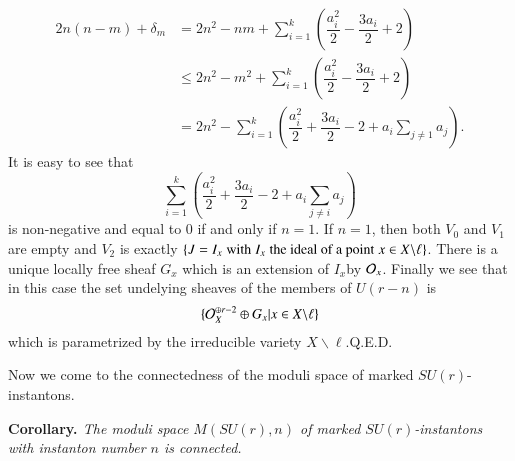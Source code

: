 \begin{itemize}
\begin{equation*}
\begin{split}
2n(n-m)+ \delta_{m} & = 2n^{2}-nm + \sum\limits_{i=1}^{k}\left(\dfrac{a_{i}^{2}}{2}- \dfrac{3a_{i}}{2} + 2\right)\\
& \leq 2n^{2}-m^{2} + \sum\limits_{i=1}^{k}\left(\dfrac{a_{i}^{2}}{2}-\dfrac{3a_{i}}{2} + 2 \right)\\
&= 2n^{2}- \sum\limits_{i=1}^{k}\left(\dfrac{a_{i}^{2}}{2} + \dfrac{3a_{i}}{2}-2 +a_{i}\sum\limits_{j \neq 1}a_{j}\right).
\end{split}
\end{equation*}
It is easy to see that
$$
\sum\limits_{i=1}^{k}\left(\dfrac{a_{i}^{2}}{2} + \dfrac{3a_{i}}{2}-2 +a_{i} \sum\limits_{j \neq i}a_{j}\right)
$$
is non-negative and equal to $0$ if and only if $n=1$. If $n=1$, then both  $V_{0}$ and $V_{1}$ are empty and $V_{2}$ is exactly $\{J=I_{x}\; \text{with}\; I_{x}\;\break \text{the ideal of a point} \;x \in X \backslash \ell \}$. There is a unique locally free sheaf $G_{x}$ which is an extension of $I_{x}$\pageoriginale by $\mathcal{O}_{x}$. Finally we see that in this case the set undelying sheaves of the members of $U(r-n)$ is
$$
\{\mathcal{O}_{X}^{\oplus  r-2} \oplus G_{x}| x \in X \backslash \ell\}
$$
which is parametrized by the irreducible variety $X\backslash \ell$.\hfill Q.E.D.

 Now we come to the connectedness of the moduli space of marked $SU(r)$-instantons.
\end{itemize}

\medskip
\noindent
{\bfseries  {} Corollary. \label{art12-coro-3.11}} \textit{The moduli space $M(SU(r), n)$ of marked $SU(r)$-instantons with instanton number $n$ is connected.}


